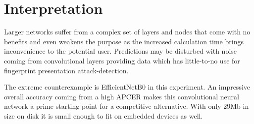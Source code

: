 
\vspace{-1cm}
\section{Interpretation}
Larger networks suffer from a complex set of layers and nodes that come with no benefits and even weakens the purpose as the increased calculation time brings inconvenience to the potential user.
Predictions may be disturbed with noise coming from convolutional layers providing data which has little-to-no use for fingerprint presentation attack-detection.

The extreme counterexample is EfficientNetB0 in this experiment.
An impressive overall accuracy coming from a high APCER makes this convolutional neural network a prime starting point for a competitive alternative.
With only 29Mb in size on disk it is small enough to fit on embedded devices as well.
